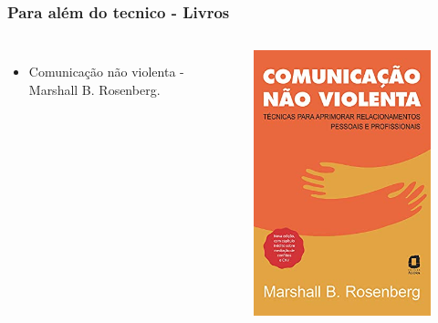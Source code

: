 \documentclass[    
  12pt, 
  compress,
  aspectratio=169,
  blue
  ]{beamer}
\begin{document}
\begin{frame}
\frametitle{ Para além do tecnico - Livros}   
\begin{columns}[c]
\begin{itemize}
\item<1-> Comunicação não violenta - Marshall B. Rosenberg.
\end{itemize}
\centering
\begin{figure}
\includegraphics[scale=0.3]{comunicacao}
\end{figure}
\end{columns}
\end{frame}
\end{document}
